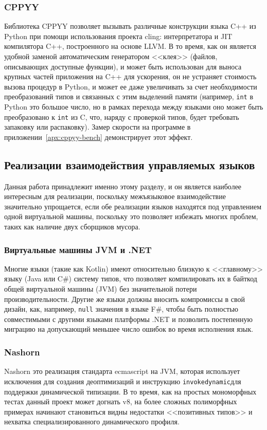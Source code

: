 \documentclass[times
]{itmo-student-thesis}
\def\Indy{\texttt{invokedynamic}}
\begin{document}
\subsubsection{CPPYY}
Библиотека CPPYY позволяет вызывать различные конструкции языка C++ из Python при помощи использования проекта cling: интерпретатора и JIT компилятора C++, построенного на основе LLVM. В то время, как он является удобной заменой автоматическим генератором <<клея>> (файлов, описывающих доступные функции), и может быть использован для выноса крупных частей приложения на C++ для ускорения, он не устраняет стоимость вызова процедур в Python, и может ее даже увеличивать за счет необходимости преобразований типов и связанных с этим выделений памяти (например, \texttt{int} в Python это большое число, но в рамках перехода между языками оно может быть преобразовано к \texttt{int} из C, что, наряду с проверкой типов, будет требовать запаковку или распаковку). Замер скорости на программе в приложении~\ref{apx:cppyy-bench} демонстрирует этот эффект.

\subsection{Реализации взаимодействия управляемых языков}
Данная работа принадлежит именно этому разделу, и он является наиболее интересным для реализации, поскольку межъязыковое взаимодействие значительно упрощается, если обе реализации языков находятся под управлением одной виртуальной машины, поскольку это позволяет избежать многих проблем, таких как наличие двух сборщиков мусора.
\subsubsection{Виртуальные машины JVM и .NET}
Многие языки (такие как Kotlin) имеют относительно близкую к <<главному>> языку (Java или C\#) систему типов, что позволяет компилировать их в байткод общей виртуальной машины (JVM) без значительной потери производительности. Другие же языки должны вносить компромиссы в свой дизайн, как, например, \texttt{null} значения в языке F\#, чтобы быть полностью совместимыми с другими языками платформы .NET и позволить постепенную миграцию на допускающий меньшее число ошибок во время исполнения язык.
\subsubsection{Nashorn}
Nashorn это реализация стандарта ecmascript на JVM, которая использует исключения для создания деоптимизаций и инструкцию \Indy для поддержки динамической типизации. В то время, как на простых мономорфных тестах данный проект может догнать v8, на более сложных полиморфных примерах начинают становиться видны недостатки <<позитивных типов>> и нехватка специализированного динамического профиля.
\end{document}
